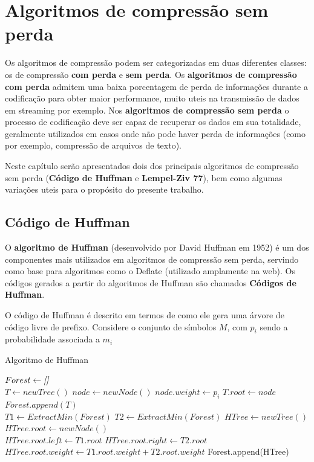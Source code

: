 \chapter{Algoritmos de compressão sem perda}\label{cap:comp}

Os algoritmos de compressão podem ser categorizadas em duas diferentes classes: os de compressão \textbf{com perda} e \textbf{sem perda}. 
Os \textbf{algoritmos de compressão com perda} admitem uma baixa porcentagem de perda de informações durante a codificação para obter maior performance, muito uteis na transmissão de dados em streaming por exemplo. 
Nos \textbf{algoritmos de compressão sem perda} o processo de codificação deve ser capaz de recuperar os dados em sua totalidade, geralmente utilizados em casos onde não pode haver perda de informações (como por exemplo, compressão de arquivos de texto).

Neste capítulo serão apresentados dois dos principais algoritmos de compressão sem perda (\textbf{Código de Huffman} e \textbf{Lempel-Ziv 77}), bem como algumas variações uteis para o propósito do presente trabalho.

\pagebreak

\section{Código de Huffman} \label{sec:huff}
O \textbf{algoritmo de Huffman} (desenvolvido por David Huffman em 1952) é um dos componentes mais utilizados em algoritmos de compressão sem perda, servindo como base para algoritmos como o Deflate (utilizado amplamente na web).
Os códigos gerados a partir do algoritmos de Huffman são chamados \textbf{Códigos de Huffman}.

O código de Huffman é descrito em termos de como ele gera uma árvore de código livre de prefixo. 
Considere o conjunto de símbolos $M$, com $p_i$ sendo a probabilidade associada a $m_i$

\begin{algorithm}[H]
\caption{Algoritmo de Huffman} \label{alg:huff}
\begin{algorithmic}
	\State $Forest \gets \emph{[]}$\\
	 
		\State $T \gets newTree()$
		\State $node \gets newNode()$
		\State $node.weight \gets p_i$ 
		\State $T.root \gets node$
		\State $Forest.append(T)$ 
	\EndFor \\
	
		\State $T1 \gets ExtractMin(Forest)$ 
		\State $T2 \gets ExtractMin(Forest)$
		\State $HTree \gets newTree()$
		\State $HTree.root \gets newNode()$ \\
		\State $HTree.root.left \gets T1.root$
		\State $HTree.root.right \gets T2.root$
		\State $HTree.root.weight \gets T1.root.weight + T2.root.weight$
		\State Forest.append(HTree) 
	\EndWhile
\end{algorithmic}
\end{algorithm}

